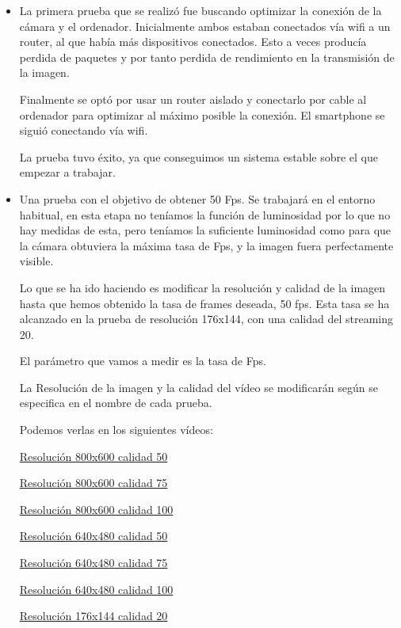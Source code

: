 \begin{itemize}
	
	\item La primera prueba	que se realizó fue buscando optimizar la conexión de la cámara y el ordenador. Inicialmente ambos estaban conectados vía wifi a un router, al que había más dispositivos conectados. Esto a veces producía perdida de paquetes y por tanto perdida de rendimiento en la transmisión de la imagen. 
	
	Finalmente se optó por usar un router aislado y conectarlo por cable al ordenador para optimizar al máximo posible la conexión. El smartphone se siguió conectando vía wifi.
	
	La prueba tuvo éxito, ya que conseguimos un sistema estable sobre el que empezar a trabajar.
	
	\item Una prueba con el objetivo de obtener 50 Fps. Se trabajará en el entorno habitual, en esta etapa no teníamos la función de luminosidad por lo que no hay medidas de esta, pero teníamos la suficiente luminosidad como para que la cámara obtuviera la máxima tasa de Fps, y la imagen fuera perfectamente visible.
	
Lo que se ha ido haciendo es modificar la resolución y calidad de la imagen hasta que hemos obtenido la tasa de frames deseada, 50 fps. Esta tasa se ha alcanzado en la prueba de resolución 176x144, con una calidad del streaming 20.

El parámetro que vamos a medir es la tasa de Fps.

La Resolución de la imagen y la calidad del vídeo se modificarán según se especifica en el nombre de cada prueba. 

Podemos verlas en los siguientes vídeos:
	
	\href{https://youtu.be/r73s9I_8SiI}{Resolución 800x600 calidad 50}
	
	\href{https://youtu.be/rdv0COnl-G4}{Resolución 800x600 calidad 75}
	
	\href{https://youtu.be/tGip7sWjD8E}{Resolución 800x600 calidad 100}
	
	\href{https://youtu.be/saFDDQNjsEs}{Resolución 640x480 calidad 50}
	
	\href{https://youtu.be/a3ZxLQB37k0}{Resolución 640x480 calidad 75}
	
	\href{https://youtu.be/zu8rWr31fuQ}{Resolución 640x480 calidad 100}
	
	\href{https://youtu.be/WzJjXKeKpaI}{Resolución 176x144 calidad 20}	
	

\end{itemize}
